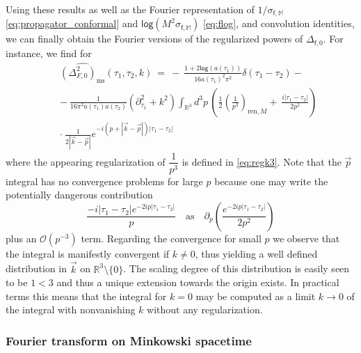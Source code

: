 \documentclass[11pt]{book}
\renewcommand{\log}{\mathsf{log}}
\newcommand{\bigint}{\displaystyle\int}
\newcommand{\Ocal}{\mathcal{O}}
\newcommand{\Mbb}{\mathbb{M}}
\newcommand{\fsf}{\mathsf{f}}
\theoremstyle{break}
\begin{document}
Using these results as well as the Fourier representation of $1/\sigma_{\fsf,\Mbb}$ \eqref{eq:propagator_conformal} and $\log \left(M^2\sigma_{\fsf,\Mbb}\right)$
\eqref{eq:flog}, and convolution identities, we can finally obtain the Fourier versions of the regularized powers of $\Delta_{\fsf,0}$. For instance, we find for 
%
\begin{eqnarray}
&& \widehat{\left(\Delta^2_{F,0}\right)_\text{ms}}(\tau_1,\tau_2,k) \ = \ - \ \frac{1+2\log (a(\tau_1))}{16a(\tau_1)^2\pi^2}\delta(\tau_1-\tau_2)- \nonumber \\
&& - \ \frac{1}{16\pi^3 a(\tau_1)a(\tau_2)}(\partial^2_{\tau_1}+k^2)\bigint_{\mathbb{R}^3}d^3p\,\left(\frac12\left(\frac{1}{p^3}\right)_{\text{ren},M}  + \ \frac{i|\tau_1-\tau_2|}{2p^2}\right) \nonumber \\
&& \cdot \ \frac{1}{2|\vec{k}-\vec{p}|}e^{-i(p+|\vec{k}-\vec{p}|)|\tau_1-\tau_2|}
\label{eq:fourier_square}
\end{eqnarray}
%
where the appearing regularization of $\dfrac{1}{p^3}$ is defined in \eqref{eq:regk3}. Note that the $\vec{p}$ integral has no convergence problems for large $p$ because one may write the potentially dangerous contribution 
%
\begin{equation*}
\frac{-i|\tau_1-\tau_2|e^{-2ip|\tau_1-\tau_2|}}{p}
\quad
\mbox{as}
\quad
\partial_p\left( \dfrac{e^{-2ip|\tau_1-\tau_2|}}{2p^2}\right) 
\end{equation*}
%
plus an $\Ocal(p^{-3})$ term. Regarding the convergence for small $p$ we observe that the integral is manifestly convergent if $k\neq0$, thus yielding a well defined distribution in $\vec{k}$ on $\mathbb{R}^3\setminus\{0\}$. The scaling degree of this distribution is easily seen to be $1<3$ and thus a unique extension towards the origin exists. In practical terms this means that the integral for $k=0$ may be computed as a limit $k\to0$ of the integral with nonvanishing $k$ without any regularization. 


\subsubsection{Fourier transform on Minkowski spacetime}
\end{document}
